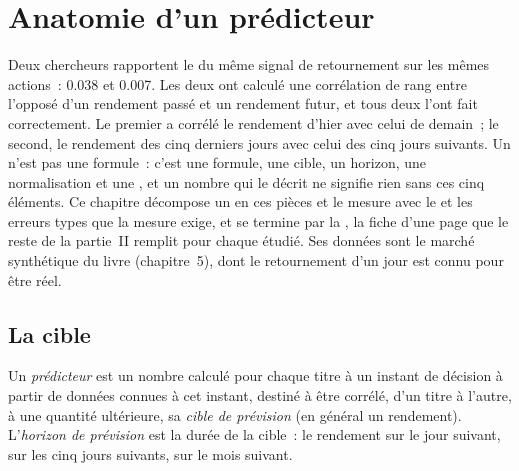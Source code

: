 \chapter{Anatomie d'un prédicteur}\label{ch:rs:anatomy-of-a-predictor}

Deux chercheurs rapportent le  du même signal de retournement sur les mêmes actions~: 0.038 et 0.007. Les deux
ont calculé une corrélation de rang entre l'opposé d'un rendement passé et un rendement futur, et tous deux l'ont fait correctement. Le premier
a corrélé le rendement d'hier avec celui de demain~; le second, le rendement des cinq derniers jours avec celui des cinq jours suivants. Un 
n'est pas une formule~: c'est une formule, une cible, un horizon, une normalisation et une , et un nombre qui le décrit ne signifie
rien sans ces cinq éléments. Ce chapitre décompose un  en ces pièces et le mesure avec le 
et les erreurs types que la mesure exige, et se termine par la , la fiche d'une page que
le reste de la partie~II remplit pour chaque  étudié. Ses données sont le marché synthétique du livre (chapitre~5), dont
le retournement d'un jour est connu pour être réel.

\section{La cible}

\begin{definition}\label{def:rs:anatomy-of-a-predictor:predictor}
Un \emph{prédicteur} est un nombre calculé pour chaque titre à un instant de décision à partir de données connues à cet instant,
destiné à être corrélé, d'un titre à l'autre, à une quantité ultérieure, sa \emph{cible de prévision}
(en général un rendement). L'\emph{horizon de prévision} est la durée de la cible~: le rendement sur le
jour suivant, sur les cinq jours suivants, sur le mois suivant.
\end{definition}

